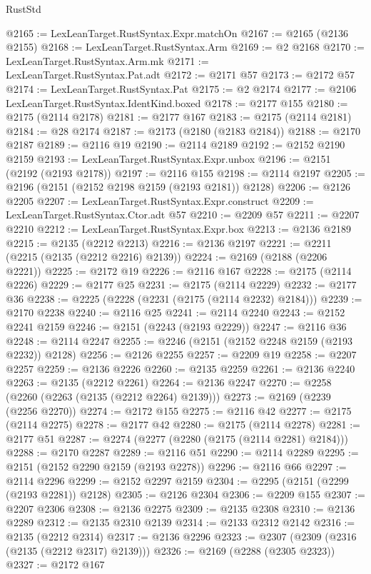 \begin{lexlean}{RustStd}
\begin{coremodule}
@2165 := LexLeanTarget.RustSyntax.Expr.matchOn
@2167 := @2165 (@2136 @2155)
@2168 := LexLeanTarget.RustSyntax.Arm
@2169 := @2 @2168
@2170 := LexLeanTarget.RustSyntax.Arm.mk
@2171 := LexLeanTarget.RustSyntax.Pat.adt
@2172 := @2171 @57
@2173 := @2172 @57
@2174 := LexLeanTarget.RustSyntax.Pat
@2175 := @2 @2174
@2177 := @2106 LexLeanTarget.RustSyntax.IdentKind.boxed
@2178 := @2177 @155
@2180 := @2175 (@2114 @2178)
@2181 := @2177 @167
@2183 := @2175 (@2114 @2181)
@2184 := @28 @2174
@2187 := @2173 (@2180 (@2183 @2184))
@2188 := @2170 @2187
@2189 := @2116 @19
@2190 := @2114 @2189
@2192 := @2152 @2190 @2159
@2193 := LexLeanTarget.RustSyntax.Expr.unbox
@2196 := @2151 (@2192 (@2193 @2178))
@2197 := @2116 @155
@2198 := @2114 @2197
@2205 := @2196 (@2151 (@2152 @2198 @2159 (@2193 @2181)) @2128)
@2206 := @2126 @2205
@2207 := LexLeanTarget.RustSyntax.Expr.construct
@2209 := LexLeanTarget.RustSyntax.Ctor.adt @57
@2210 := @2209 @57
@2211 := @2207 @2210
@2212 := LexLeanTarget.RustSyntax.Expr.box
@2213 := @2136 @2189
@2215 := @2135 (@2212 @2213)
@2216 := @2136 @2197
@2221 := @2211 (@2215 (@2135 (@2212 @2216) @2139))
@2224 := @2169 (@2188 (@2206 @2221))
@2225 := @2172 @19
@2226 := @2116 @167
@2228 := @2175 (@2114 @2226)
@2229 := @2177 @25
@2231 := @2175 (@2114 @2229)
@2232 := @2177 @36
@2238 := @2225 (@2228 (@2231 (@2175 (@2114 @2232) @2184)))
@2239 := @2170 @2238
@2240 := @2116 @25
@2241 := @2114 @2240
@2243 := @2152 @2241 @2159
@2246 := @2151 (@2243 (@2193 @2229))
@2247 := @2116 @36
@2248 := @2114 @2247
@2255 := @2246 (@2151 (@2152 @2248 @2159 (@2193 @2232)) @2128)
@2256 := @2126 @2255
@2257 := @2209 @19
@2258 := @2207 @2257
@2259 := @2136 @2226
@2260 := @2135 @2259
@2261 := @2136 @2240
@2263 := @2135 (@2212 @2261)
@2264 := @2136 @2247
@2270 := @2258 (@2260 (@2263 (@2135 (@2212 @2264) @2139)))
@2273 := @2169 (@2239 (@2256 @2270))
@2274 := @2172 @155
@2275 := @2116 @42
@2277 := @2175 (@2114 @2275)
@2278 := @2177 @42
@2280 := @2175 (@2114 @2278)
@2281 := @2177 @51
@2287 := @2274 (@2277 (@2280 (@2175 (@2114 @2281) @2184)))
@2288 := @2170 @2287
@2289 := @2116 @51
@2290 := @2114 @2289
@2295 := @2151 (@2152 @2290 @2159 (@2193 @2278))
@2296 := @2116 @66
@2297 := @2114 @2296
@2299 := @2152 @2297 @2159
@2304 := @2295 (@2151 (@2299 (@2193 @2281)) @2128)
@2305 := @2126 @2304
@2306 := @2209 @155
@2307 := @2207 @2306
@2308 := @2136 @2275
@2309 := @2135 @2308
@2310 := @2136 @2289
@2312 := @2135 @2310 @2139
@2314 := @2133 @2312 @2142
@2316 := @2135 (@2212 @2314)
@2317 := @2136 @2296
@2323 := @2307 (@2309 (@2316 (@2135 (@2212 @2317) @2139)))
@2326 := @2169 (@2288 (@2305 @2323))
@2327 := @2172 @167

\end{coremodule}
\end{lexlean}
